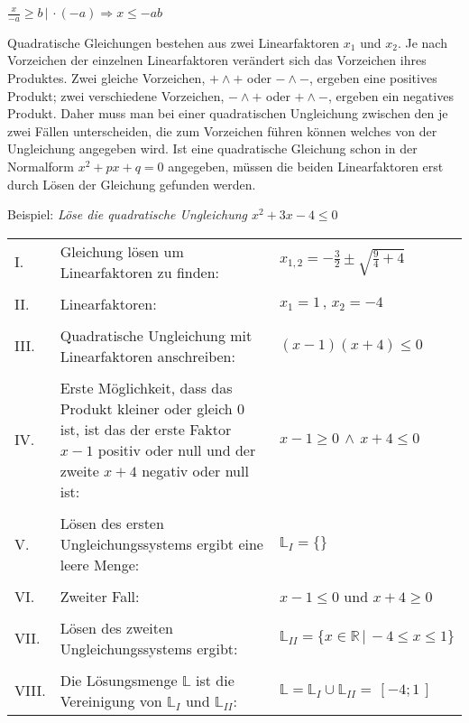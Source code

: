 $\frac{x}{-a} \geq b \,|\, \cdot (-a) \Rightarrow x \leq -ab$


Quadratische Gleichungen bestehen aus zwei Linearfaktoren $x_1$ und $x_2$. Je nach Vorzeichen der einzelnen Linearfaktoren ver\"{a}ndert sich das Vorzeichen ihres Produktes. Zwei gleiche Vorzeichen, $+ \land +$ oder $- \land -$, ergeben eine positives Produkt; zwei verschiedene Vorzeichen, $- \land +$ oder $+ \land -$, ergeben ein negatives Produkt. Daher muss man bei einer quadratischen Ungleichung zwischen den je zwei F\"{a}llen unterscheiden, die zum Vorzeichen f\"{u}hren k\"{o}nnen welches von der Ungleichung angegeben wird. Ist eine quadratische Gleichung schon in der Normalform $x^2 + px + q = 0$ angegeben, m\"{u}ssen die beiden Linearfaktoren erst durch L\"{o}sen der Gleichung gefunden werden. 

\pagebreak

Beispiel: \emph{L\"{o}se die quadratische Ungleichung $x^2 + 3x - 4 \leq 0$}

\begin{table}[h!]
	\begin{tabular}{p{0.3cm} p{10cm} l}
		I. & Gleichung l\"{o}sen um Linearfaktoren zu finden: & $x_{1,2} = -\frac{3}{2} \pm \sqrt{\frac{9}{4} + 4}$ 
		\\ && \\
		II. & Linearfaktoren: & $x_1 = 1\,,\,x_2 = -4$
		\\ && \\
		III. & Quadratische Ungleichung mit Linearfaktoren anschreiben: & $(x - 1)(x + 4) \leq 0$
		\\ && \\
		IV. & Erste M\"{o}glichkeit, dass das Produkt kleiner oder gleich 0 ist, ist das der erste Faktor $x - 1$ positiv oder null und der zweite $x + 4$ negativ oder null ist: & $x - 1 \geq 0 \,\land\, x + 4 \leq 0$
		\\ && \\
		V. & L\"{o}sen des ersten Ungleichungssystems ergibt eine leere Menge: & $\mathbb{L}_I = \{ \}$
		\\ && \\
		VI. & Zweiter Fall: & $x - 1 \leq 0$ und $x + 4 \geq 0$
		\\ && \\
		VII. & L\"{o}sen des zweiten Ungleichungssystems ergibt: & $\mathbb{L}_{II} = \{ x \in \mathbb{R} \,|\, -4 \leq x \leq 1\}$
		\\ && \\
		VIII. & Die L\"{o}sungsmenge $\mathbb{L}$ ist die Vereinigung von $\mathbb{L}_{I}$ und $\mathbb{L}_{II}$: & $\mathbb{L} = \mathbb{L}_I \cup \mathbb{L}_{II} = \,[-4;1 \,]$
	\end{tabular}
\end{table}

